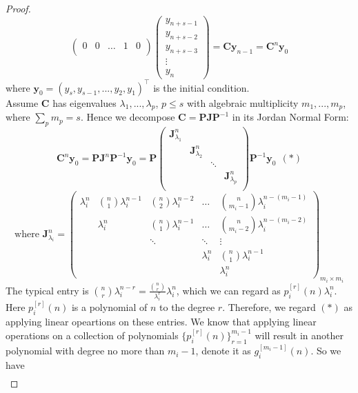 \documentclass[a4paper, 10pt]{article}
\theoremstyle{definition}
\theoremstyle{hSol}
\begin{document}
\begin{proof}
$$\begin{pmatrix}
    0 & 0 & \hdots & 1 & 0\\
\end{pmatrix} 
\begin{pmatrix}
  y_{n+s-1} \\
  y_{n+s-2} \\
  y_{n+s-3} \\
  \vdots \\
  y_{n}
\end{pmatrix} = \bm{Cy}_{n-1} = \bm{C}^{n} \bm{y}_0
$$
where $\bm{y}_0 = (y_s, y_{s-1}, ..., y_2, y_1)^{\top}$ is the initial condition.\\
Assume $\bm{C}$ has eigenvalues $\lambda_1, ..., \lambda_p$, $p\leq s$ with algebraic multiplicity $m_1, ..., m_p$, where $\sum_p m_p = s$. Hence we decompose $\bm{C} = \bm{PJ}\bm{P}^{-1}$ in its Jordan Normal Form: 
$$
\bm{C}^n \bm{y}_0 = \bm{P} \bm{J}^n \bm{P}^{-1} \bm{y}_0 = \bm{P} \begin{pmatrix}
  \bm{J}_{\lambda_1}^n & & \\
  & \bm{J}_{\lambda_2}^n &  \\
  & & \ddots & \\
  & & & \bm{J}_{\lambda_p}^n
  \\
\end{pmatrix} \bm{P}^{-1} \bm{y}_0~~(*)
$$
$$
\text{where } \bm{J}_{\lambda_i}^n = 
\begin{pmatrix}
   \lambda_i^n & \binom{n}{1} \lambda_i^{n-1} & \binom{n}{2} \lambda_i^{n-2} & \hdots & \binom{n}{m_{i}-1} \lambda_i^{n-(m_i-1)}\\
   & \lambda_i^n & \binom{n}{1} \lambda_i^{n-1} & \hdots & \binom{n}{m_{i}-2} \lambda_i^{n-(m_i-2)}\\
   & & \ddots & \ddots & \vdots \\
   & & & \lambda_i^n &  \binom{n}{1} \lambda_i^{n-1}\\
   & & & & \lambda_i^n
\end{pmatrix}_{m_i \times m_i}
$$
The typical entry is $\binom{n}{r} \lambda_i^{n-r} = \frac{\binom{n}{r}}{\lambda_i^r} \lambda_i^n$, which we can regard as $p^{[r]}_i(n) \lambda_i^n$. Here $p^{[r]}_i(n)$ is a polynomial of $n$ to the degree $r$. Therefore, we regard $(*)$ as applying linear opeartions on these entries. We know that applying linear operations on a collection of polynomials $\{p^{[r]}_i(n)\}_{r=1}^{m_i-1}$ will result in another polynomial with degree no more than $m_i-1$, denote it as $g_i^{[m_i-1]}(n)$. So we have
\begin{equation}
  \begin{split}

\end{split}
\end{equation}
\end{proof}
\end{document}
